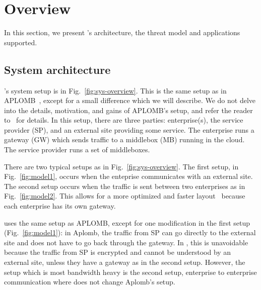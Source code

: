 


     
\section{Overview}\label{sec:overview}








In this section, we present \sys's architecture, the threat model and applications supported.


\subsection{System architecture}

\sys's system setup is in Fig.~\ref{fig:sys-overview}. This is the same setup as in APLOMB~\cite{aplomb}, 
except for a small difference which we will describe. 
We do not delve into the details, motivation, and gains of APLOMB's setup, and refer the reader to~\cite{aplomb} for details. 
In this setup, there are three parties: enterprise(s), the service provider (SP), and an external site providing
some service. The enterprise runs a gateway (GW) which sends traffic to a middlebox (MB) running in the cloud.
The service provider runs a set of middleboxes. 

There are two typical setups as in Fig.~\ref{fig:sys-overview}.  The first setup, in Fig.~\ref{fig:model1},  occurs when the enteprise communicates with an external site. The second setup occurs when the traffic is sent between two enterprises as in Fig.~\ref{fig:model2}. This allows for a more optimized and faster layout~\cite{aplomb} because  each enterprise has its own gateway.

\sys uses the same setup as APLOMB, except for one modification in the first setup (Fig.~\ref{fig:model1}): in Aplomb, the traffic from SP can go directly to the external site and does not have to go back through the gateway. In \sys, this is unavoidable because the traffic from SP is encrypted and cannot be understood by an external site, unless they have a gateway as in the second setup. However, the setup which is most bandwidth heavy is the second setup, enterprise to enterprise communication where \sys does not change Aplomb's setup.



